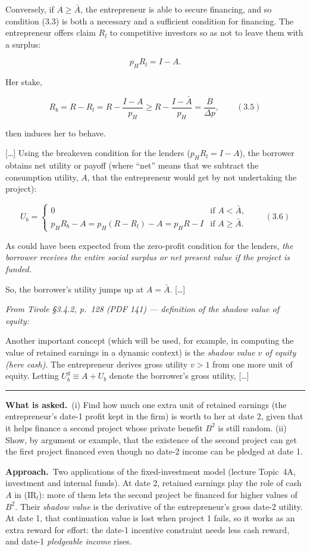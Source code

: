\documentclass[11pt,a4paper]{article}
\newcommand{\asked}{\par\medskip\noindent\textbf{What is asked.}~}
\newcommand{\approach}{\par\smallskip\noindent\textbf{Approach.}~}
\newcommand{\stmtend}{\par\endgroup\nopagebreak\noindent\rule{\linewidth}{0.4pt}\par\medskip}
\begin{document}
Conversely, if \(A \geqslant \bar A\), the entrepreneur is able to secure financing, and so
condition (3.3) is both a necessary and a sufficient condition for financing. The entrepreneur
offers claim \(R_l\) to competitive investors so as not to leave them with a surplus:

\[p_H R_l = I - A.\]

Her stake,

\[R_b = R - R_l = R - \frac{I - A}{p_H} \geqslant R - \frac{I - \bar A}{p_H} = \frac{B}{\Delta p}, \qquad (3.5)\]

then induces her to behave.

{[}\ldots{]} Using the breakeven condition for the lenders (\(p_H R_l = I - A\)), the borrower
obtains net utility or payoff (where ``net'' means that we subtract the consumption utility, \(A\),
that the entrepreneur would get by not undertaking the project):

\[U_b = \begin{cases} 0 & \text{if } A < \bar A, \\ p_H R_b - A = p_H(R - R_l) - A = p_H R - I & \text{if } A \geqslant \bar A. \end{cases} \qquad (3.6)\]

As could have been expected from the zero-profit condition for the lenders, \emph{the borrower
receives the entire social surplus or net present value if the project is funded.}

So, the borrower's utility jumps up at \(A = \bar A\). {[}\ldots{]}

\emph{From Tirole §3.4.2, p.~128 (PDF 141) --- definition of the shadow value of equity:}

Another important concept (which will be used, for example, in computing the value of retained
earnings in a dynamic context) is the \emph{shadow value \(v\) of equity (here cash)}. The
entrepreneur derives gross utility \(v > 1\) from one more unit of equity. Letting
\(U_b^g \equiv A + U_b\) denote the borrower's gross utility, {[}\ldots{]}
\stmtend

\asked (i) Find how much one extra unit of retained earnings (the entrepreneur's date-1 profit kept
in the firm) is worth to her at date 2, given that it helps finance a second project whose private
benefit $B^2$ is still random. (ii) Show, by argument or example, that the existence of the second
project can get the first project financed even though no date-2 income can be pledged at date 1.

\approach Two applications of the fixed-investment model (lecture Topic~4A, investment and internal
funds). At date 2, retained earnings play the role of cash $A$ in (IR$_l$): more of them lets the
second project be financed for higher values of $B^2$. Their \emph{shadow value} is the derivative of
the entrepreneur's gross date-2 utility. At date 1, that continuation value is lost when project 1
fails, so it works as an extra reward for effort: the date-1 incentive constraint needs less cash
reward, and date-1 \emph{pledgeable income} rises.
\end{document}
